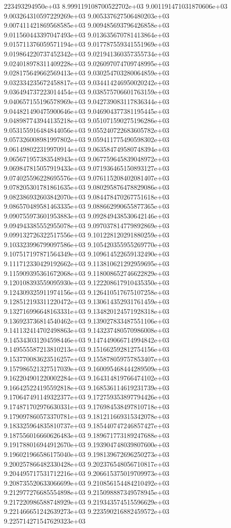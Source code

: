 223493294950e+03	8.999119108700522702e+03	9.001191471031870606e+03	9.003264310597229269e+03	9.005337627506480203e+03	9.007411421869568585e+03	9.009485693796426858e+03	9.011560443397047493e+03	9.013635670781413864e+03	9.015711376059571194e+03	9.017787559341551969e+03	9.019864220737452342e+03	9.021941360357355734e+03	9.024018978311409228e+03	9.026097074709748995e+03	9.028175649662569413e+03	9.030254703280064859e+03	9.032334235672458817e+03	9.034414246950020242e+03	9.036494737223014454e+03	9.038575706601763159e+03	9.040657155196578969e+03	9.042739083117836344e+03	9.044821490475900646e+03	9.046904377381195445e+03	9.048987743944135218e+03	9.051071590275196286e+03	9.053155916484844056e+03	9.055240722683605782e+03	9.057326008981997802e+03	9.059411775490598302e+03	9.061498022319970914e+03	9.063584749580748394e+03	9.065671957383548943e+03	9.067759645839048972e+03	9.069847815057919433e+03	9.071936465150893127e+03	9.074025596228695576e+03	9.076115208402081407e+03	9.078205301781861635e+03	9.080295876478829086e+03	9.082386932603842070e+03	9.084478470267751618e+03	9.086570489581463335e+03	9.088662990655877365e+03	9.090755973601953883e+03	9.092849438530642146e+03	9.094943385552955078e+03	9.097037814779892869e+03	9.099132726322517556e+03	9.101228120291880259e+03	9.103323996799097586e+03	9.105420355955269770e+03	9.107517197871564349e+03	9.109614522659132490e+03	9.111712330429192662e+03	9.113810621292959695e+03	9.115909395361672068e+03	9.118008652746622829e+03	9.120108393559095930e+03	9.122208617910435350e+03	9.124309325911974156e+03	9.126410517675107258e+03	9.128512193311220472e+03	9.130614352931761459e+03	9.132716996648163331e+03	9.134820124571928318e+03	9.136923736814540462e+03	9.139027833487551106e+03	9.141132414702498863e+03	9.143237480570986008e+03	9.145343031204598446e+03	9.147449066714994842e+03	9.149555587213810213e+03	9.151662592812754156e+03	9.153770083623516257e+03	9.155878059757853407e+03	9.157986521327517039e+03	9.160095468444289509e+03	9.162204901220002284e+03	9.164314819766474102e+03	9.166425224195592818e+03	9.168536114619231739e+03	9.170647491149322377e+03	9.172759353897794426e+03	9.174871702976630331e+03	9.176984538497810718e+03	9.179097860573370781e+03	9.181211669315342078e+03	9.183325964835810737e+03	9.185440747246857427e+03	9.187556016660626483e+03	9.189671773189247688e+03	9.191788016944912670e+03	9.193904748039807600e+03	9.196021966586175040e+03	9.198139672696250273e+03	9.200257866482330428e+03	9.202376548056710817e+03	9.204495717531712216e+03	9.206615375019709973e+03	9.208735520633066699e+03	9.210856154484210492e+03	9.212977276685554898e+03	9.215098887349578945e+03	9.217220986588748929e+03	9.219343574515596629e+03	9.221466651242639273e+03	9.223590216882459572e+03	9.225714271547629323e+03
